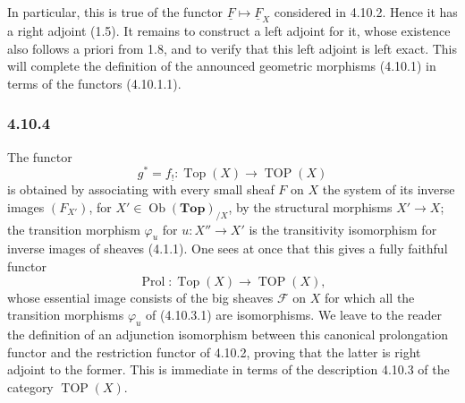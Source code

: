 \documentclass[11pt]{article}
\newcommand{\Esp}{\mathbf{Top}}
\newcommand{\Top}{\operatorname{Top}}
\newcommand{\TOP}{\operatorname{TOP}}
\newcommand{\Ob}{\operatorname{Ob}}
\newcommand{\Prol}{\operatorname{Prol}}
\providecommand{\Ob}{\operatorname{Ob}}
\begin{document}
In particular, this is true of the functor \(\underline F\mapsto\underline F_X\) considered in 4.10.2. Hence it has a right adjoint (1.5). It remains to construct a left adjoint for it, whose existence also follows a priori from 1.8, and to verify that this left adjoint is left exact. This will complete the definition of the announced geometric morphisms (4.10.1) in terms of the functors (4.10.1.1).

\subsubsection*{4.10.4}
The functor
\[
g^\ast=f_!:\Top(X)\longrightarrow\TOP(X)
\]
is obtained by associating with every small sheaf \(F\) on \(X\) the system of its inverse images \((F_{X'})\), for \(X'\in\Ob(\Esp)_{/X}\), by the structural morphisms \(X'\to X\); the transition morphism \(\varphi_u\) for \(u:X''\to X'\) is the transitivity isomorphism for inverse images of sheaves (4.1.1). One sees at once that this gives a fully faithful functor
\[
\Prol:\Top(X)\longrightarrow\TOP(X),
\]
whose essential image consists of the big sheaves \(\mathcal F\) on \(X\) for which all the transition morphisms \(\varphi_u\) of (4.10.3.1) are isomorphisms. We leave to the reader the definition of an adjunction isomorphism between this canonical prolongation functor and the restriction functor of 4.10.2, proving that the latter is right adjoint to the former. This is immediate in terms of the description 4.10.3 of the category \(\TOP(X)\).
\end{document}
